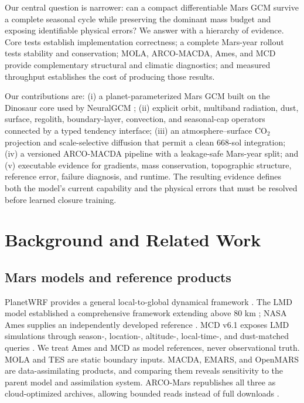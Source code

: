 \documentclass{article}
\begin{document}
Our central question is narrower: can a compact differentiable Mars GCM
survive a complete seasonal cycle while preserving the dominant mass budget and
exposing identifiable physical errors? We answer with a hierarchy of evidence.
Core tests establish implementation correctness; a complete Mars-year rollout
tests stability and conservation; MOLA, ARCO-MACDA, Ames, and MCD provide
complementary structural and climatic diagnostics; and measured throughput
establishes the cost of producing those results.

Our contributions are: (i) a planet-parameterized Mars GCM built on the
Dinosaur core used by NeuralGCM \citep{dinosaur2024}; (ii) explicit orbit,
multiband radiation, dust, surface, regolith, boundary-layer, convection, and
seasonal-cap operators connected by a typed tendency interface; (iii) an
atmosphere--surface \(\mathrm{CO_2}\) projection and scale-selective diffusion
that permit a clean 668-sol integration; (iv) a versioned ARCO-MACDA pipeline
with a leakage-safe Mars-year split; and (v) executable evidence for gradients,
mass conservation, topographic structure, reference error, failure diagnosis,
and runtime. The resulting evidence defines both the model's current capability
and the physical errors that must be resolved before learned closure training.

\section{Background and Related Work}

\subsection{Mars models and reference products}
PlanetWRF provides a general local-to-global dynamical framework
\citep{richardson2007planetwrf}. The LMD model established a comprehensive
framework extending above 80 km \citep{forget1999improved}; NASA Ames supplies
an independently developed reference \citep{haberle2019ames}. MCD v6.1 exposes LMD simulations through
season-, location-, altitude-, local-time-, and dust-matched queries
\citep{mcd61}. We treat Ames and MCD as model references, never observational
truth. MOLA and TES are static boundary inputs. MACDA, EMARS, and OpenMARS are
data-assimilating products, and comparing them reveals sensitivity to the parent
model and assimilation system. ARCO-Mars republishes all three as cloud-optimized
archives, allowing bounded reads instead of full downloads
\citep{bhattacharya2026arcomars}.
\end{document}
